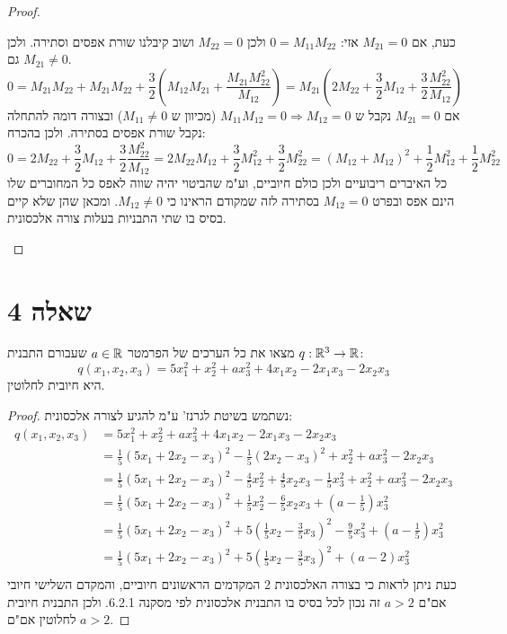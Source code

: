 \documentclass{article}
\begin{document}
\begin{proof}
\begin{enumerate}
            כעת, אם $M_{21} = 0$ אזי: $0 = M_{11}M_{22}$ ולכן $M_{22} = 0$ ושוב קיבלנו שורת אפסים וסתירה. ולכן גם $M_{21} \neq 0$. \\
            \[
            0
            = M_{21}M_{22} + M_{21}M_{22} + \frac{3}{2} (M_{12}M_{21} + \frac{M_{21}M_{22}^2}{M_{12}} )
            = M_{21} (2M_{22} + \frac{3}{2}M_{12} + \frac{3}{2}\frac{M_{22}^2}{M_{12}} )
            \]
            אם $M_{21} = 0$ נקבל ש $M_{11}M_{12} = 0 \Rightarrow M_{12} = 0$ (מכיוון ש $M_{11} \neq 0$)
            ובצורה דומה להתחלה נקבל שורת אפסים בסתירה.
            ולכן בהכרח:
            \[
            0 = 2M_{22} + \frac{3}{2}M_{12} + \frac{3}{2}\frac{M_{22}^2}{M_{12}}
            = 2M_{22}M_{12} + \frac{3}{2}M_{12}^2+ \frac{3}{2}M_{22}^2
            = (M_{12} + M_{12})^2 + \frac{1}{2}M_{12}^2+ \frac{1}{2}M_{22}^2
            \]
            כל האיברים ריבועיים ולכן כולם חיוביים, וע"מ שהביטוי יהיה שווה לאפס כל המחוברים שלו הינם אפס
            ובפרט $M_{12} = 0$
            בסתירה לזה שמקודם הראינו כי $M_{12} \neq 0$.
            ומכאן שהן שלא קיים בסיס בו שתי התבניות בעלות צורה אלכסונית.
    \end{enumerate}
    \end{proof}


\section*{שאלה 4}
    מצאו את כל הערכים של הפרמטר $a \in \mathbb{R}$ שעבורם התבנית $q: \mathbb{R}^3 \rightarrow \mathbb{R}$:
    \[ q(x_1, x_2, x_3) = 5x_1^2 + x_2^2 + ax_3^2 + 4x_1x_2 - 2x_1x_3 - 2x_2x_3 \]
    היא חיובית לחלוטין.
    \begin{proof}
        נשתמש בשיטת לגרנז' ע"מ להגיע לצורה אלכסונית:
        \begin{align*}
            q(x_1, x_2, x_3)
            &= 5x_1^2 + x_2^2 + ax_3^2 + 4x_1x_2 - 2x_1x_3 - 2x_2x_3 \\
            &= \frac{1}{5}(5x_1 + 2x_2 - x_3)^2 - \frac{1}{5}(2x_2 - x_3)^2 + x_2^2 + ax_3^2 - 2x_2x_3 \\
            &= \frac{1}{5}(5x_1 + 2x_2 - x_3)^2 - \frac{4}{5}x_2^2 + \frac{4}{5}x_2x_3 - \frac{1}{5}x_3^2 + x_2^2 + ax_3^2 - 2x_2x_3 \\
            &= \frac{1}{5}(5x_1 + 2x_2 - x_3)^2 + \frac{1}{5}x_2^2 - \frac{6}{5}x_2x_3 + (a - \frac{1}{5})x_3^2 \\
            &= \frac{1}{5}(5x_1 + 2x_2 - x_3)^2 + 5(\frac{1}{5}x_2 - \frac{3}{5}x_3)^2 - \frac{9}{5}x_3^2  + (a - \frac{1}{5})x_3^2 \\
            &= \frac{1}{5}(5x_1 + 2x_2 - x_3)^2 + 5(\frac{1}{5}x_2 - \frac{3}{5}x_3)^2 + (a - 2)x_3^2 \\
        \end{align*}
        כעת ניתן לראות כי בצורה האלכסונית 2 המקדמים הראשונים חיוביים, והמקדם השלישי חיובי אם"ם $a > 2$ זה נכון לכל בסיס בו התבנית אלכסונית לפי מסקנה 6.2.1.
        ולכן התבנית חיובית לחלוטין אם"ם $a > 2$.
    \end{proof}
\end{document}
